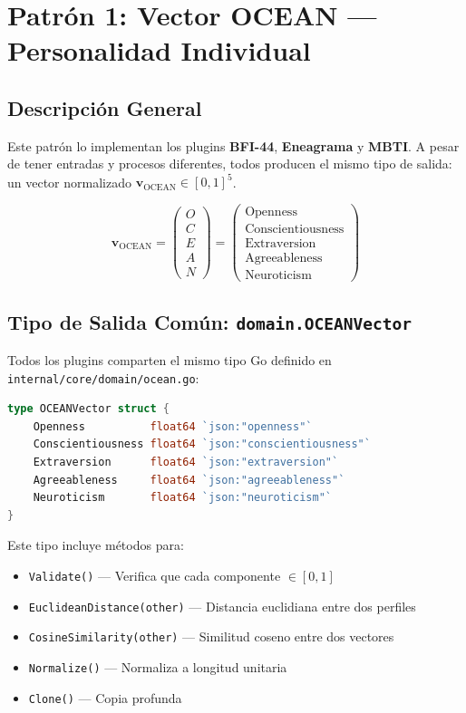 \documentclass[12pt,a4paper]{article}
\begin{document}
\section{Patrón 1: Vector OCEAN --- Personalidad Individual}
\label{sec:ocean}

\subsection{Descripción General}

Este patrón lo implementan los plugins \textbf{BFI-44}, \textbf{Eneagrama} y \textbf{MBTI}. A pesar de tener entradas y procesos diferentes, todos producen el mismo tipo de salida: un vector normalizado $\mathbf{v}_{\text{OCEAN}} \in [0, 1]^5$.

\[
\mathbf{v}_{\text{OCEAN}} = \begin{pmatrix} O \\ C \\ E \\ A \\ N \end{pmatrix} = \begin{pmatrix} \text{Openness} \\ \text{Conscientiousness} \\ \text{Extraversion} \\ \text{Agreeableness} \\ \text{Neuroticism} \end{pmatrix}
\]

\subsection{Tipo de Salida Común: \texttt{domain.OCEANVector}}

Todos los plugins comparten el mismo tipo Go definido en \texttt{internal/core/domain/ocean.go}:

\begin{lstlisting}[language=Go]
type OCEANVector struct {
    Openness          float64 `json:"openness"`
    Conscientiousness float64 `json:"conscientiousness"`
    Extraversion      float64 `json:"extraversion"`
    Agreeableness     float64 `json:"agreeableness"`
    Neuroticism       float64 `json:"neuroticism"`
}
\end{lstlisting}

Este tipo incluye métodos para:
\begin{itemize}
    \item \texttt{Validate()} --- Verifica que cada componente $\in [0, 1]$
    \item \texttt{EuclideanDistance(other)} --- Distancia euclidiana entre dos perfiles
    \item \texttt{CosineSimilarity(other)} --- Similitud coseno entre dos vectores
    \item \texttt{Normalize()} --- Normaliza a longitud unitaria
    \item \texttt{Clone()} --- Copia profunda
\end{itemize}
\end{document}
